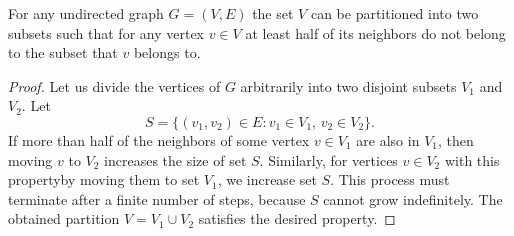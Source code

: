 \begin{theorem}
    For any undirected graph $G=(V,E)$ the set $V$ can be partitioned into two subsets such that for any vertex $v\in V$ at least half of its neighbors do not belong to the subset that $v$ belongs to.
\end{theorem}

\begin{proof}
    Let us divide the vertices of $G$ arbitrarily into two disjoint subsets $V_1$ and $V_2$.
    Let
    \[
        S = \{(v_1,v_2)\in E:v_1\in V_1,\,v_2\in V_2\}.
    \]
    If more than half of the neighbors of some vertex $v\in V_1$ are also in $V_1$, then moving $v$ to $V_2$ increases the size of set $S$.
    Similarly, for vertices $v\in V_2$ with this property\dash by moving them to set $V_1$, we increase set $S$.
    This process must terminate after a finite number of steps, because $S$ cannot grow indefinitely.
    The obtained partition $V=V_1\cup V_2$ satisfies the desired property.
\end{proof}
